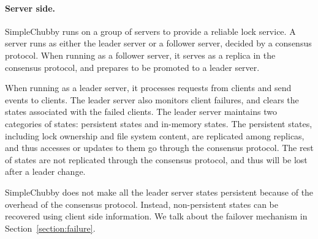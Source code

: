 \paragraph{Server side.}
SimpleChubby runs on a group of servers to provide a reliable lock service.
A server runs as either the leader server or a follower server,
decided by a consensus protocol.
When running as a follower server, it serves as a replica in the consensus
protocol, and prepares to be promoted to a leader server.

When running as a leader server, it processes requests from clients and send
events to clients.
The leader server also monitors client failures, and clears the states associated
with the failed clients.
The leader server maintains two categories of states: persistent states and
in-memory states.
The persistent states, including lock ownership and file system content,
are replicated among replicas, and thus accesses or updates to them go
through the consensus protocol.
The rest of states are not replicated through the consensus protocol,
and thus will be lost after a leader change.

SimpleChubby does not make all the leader server states persistent because
of the overhead of the consensus protocol.
Instead, non-persistent states can be recovered using client side information.
We talk about the failover mechanism in Section~\ref{section:failure}.
